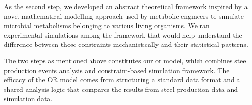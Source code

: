 As the second step, we developed an abstract theoretical framework inspired by a novel mathematical modelling approach used by metabolic engineers to simulate microbial metabolisms belonging to various living organisms. We ran experimental simulations among the framework that would help understand the difference between those constraints mechanistically and their statistical patterns.

The two steps as mentioned above constitutes our \ac{or} model, which combines steel production events analysis and constraint-based simulation framework. The efficacy of the OR model comes from structuring a standard data format and a shared analysis logic that compares the results from steel production data and simulation data.